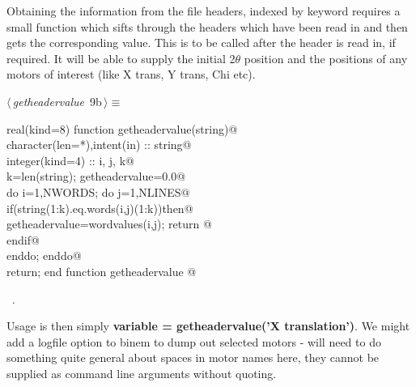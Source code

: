 \documentclass[10pt,a4paper,notitlepage]{article}
\newcommand{\code}[1]{\textbf{\textsf{#1}}} %
\begin{document}
Obtaining the information from the file headers, indexed by keyword requires
a small function which sifts through the headers which have been read in and 
then gets the corresponding value. 
This is to be called after the header is read in, if required. 
It will be able to supply the initial 2$\theta$ position and the positions of
any motors of interest (like X trans, Y trans, Chi etc).

\begin{flushleft} \small
\begin{minipage}{\linewidth}\label{scrap9}\raggedright\small
{} $\langle\,${\it getheadervalue}\nobreak\ {\footnotesize {9b}}$\,\rangle\equiv$
\vspace{-1ex}
\begin{list}{}{} \item
\mbox{}\verb@      real(kind=8) function getheadervalue(string)@\\
\mbox{}\verb@      character(len=*),intent(in) :: string@\\
\mbox{}\verb@      integer(kind=4) :: i, j, k@\\
\mbox{}\verb@      k=len(string); getheadervalue=0.0@\\
\mbox{}\verb@      do i=1,NWORDS; do j=1,NLINES@\\
\mbox{}\verb@        if(string(1:k).eq.words(i,j)(1:k))then@\\
\mbox{}\verb@          getheadervalue=wordvalues(i,j); return  @\\
\mbox{}\verb@        endif@\\
\mbox{}\verb@      enddo; enddo@\\
\mbox{}\verb@      return; end function getheadervalue                                    @{\NWsep}
\end{list}
\vspace{-1.5ex}
\footnotesize
\begin{list}{}{\setlength{\itemsep}{-\parsep}\setlength{\itemindent}{-\leftmargin}}
\item \NWtxtMacroRefIn\ .

\item{}
\end{list}
\end{minipage}\vspace{4ex}
\end{flushleft}
Usage is then simply \code{variable = getheadervalue('X translation')}.
We might add a logfile option to binem to dump out selected motors - will
need to do something quite general about spaces in motor names here, they
cannot be supplied as command line arguments without quoting.
\end{document}
